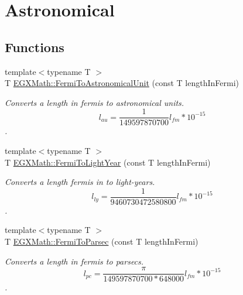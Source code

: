 \hypertarget{group___e_g_x_math-_conversions-_length_conversions-_non-_s_i-_fermi-_astronomical}{}\section{Astronomical}
\label{group___e_g_x_math-_conversions-_length_conversions-_non-_s_i-_fermi-_astronomical}
\subsection*{Functions}
\begin{DoxyCompactItemize}
\item 
{\footnotesize template$<$typename T $>$ }\\T \mbox{\hyperlink{group___e_g_x_math-_conversions-_length_conversions-_non-_s_i-_fermi-_astronomical_ga15004dd6eba6bf24f731945b4d78efcd}{E\+G\+X\+Math\+::\+Fermi\+To\+Astronomical\+Unit}} (const T length\+In\+Fermi)
\begin{DoxyCompactList}\small\item\em Converts a length in fermis to astronomical units. \[ l_{au}= \frac{1}{149597870700} l_{fm} * 10^{-15} \]. \end{DoxyCompactList}\item 
{\footnotesize template$<$typename T $>$ }\\T \mbox{\hyperlink{group___e_g_x_math-_conversions-_length_conversions-_non-_s_i-_fermi-_astronomical_ga970405631cdcf18ba0c2bd9b3ec37dec}{E\+G\+X\+Math\+::\+Fermi\+To\+Light\+Year}} (const T length\+In\+Fermi)
\begin{DoxyCompactList}\small\item\em Converts a length fermis in to light-\/years. \[ l_{ly}= \frac{1}{9460730472580800} l_{fm} * 10^{-15} \]. \end{DoxyCompactList}\item 
{\footnotesize template$<$typename T $>$ }\\T \mbox{\hyperlink{group___e_g_x_math-_conversions-_length_conversions-_non-_s_i-_fermi-_astronomical_gab8899d90957bc1951d2173162dca0672}{E\+G\+X\+Math\+::\+Fermi\+To\+Parsec}} (const T length\+In\+Fermi)
\begin{DoxyCompactList}\small\item\em Converts a length in fermis to parsecs. \[ l_{pc}=\frac{\pi}{149597870700 * 648000} l_{fm} * 10^{-15} \]. \end{DoxyCompactList}\end{DoxyCompactItemize}


